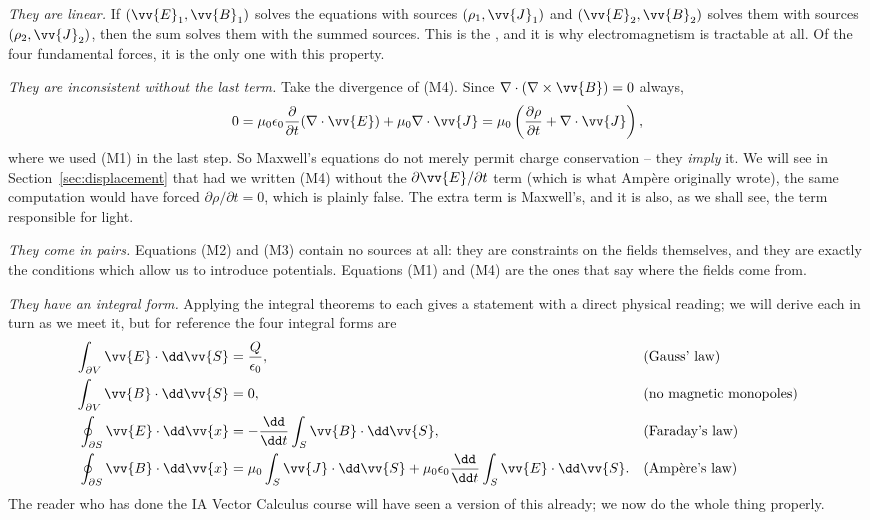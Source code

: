 \emph{They are linear.} If $(\vv{E}_1, \vv{B}_1)$ solves the equations with sources $(\rho_1, \vv{J}_1)$ and $(\vv{E}_2, \vv{B}_2)$ solves them with sources $(\rho_2, \vv{J}_2)$, then the sum solves them with the summed sources. This is the , and it is why electromagnetism is tractable at all. Of the four fundamental forces, it is the only one with this property.

\emph{They are inconsistent without the last term.} Take the divergence of (M4). Since $\nabla \cdot (\nabla \times \vv{B}) = 0$ always,
$$
0 = \mu_0 \epsilon_0 \frac{\partial}{\partial t}(\nabla \cdot \vv{E}) + \mu_0 \nabla \cdot \vv{J} = \mu_0\left(\frac{\partial \rho}{\partial t} + \nabla \cdot \vv{J}\right),
$$
where we used (M1) in the last step. So Maxwell's equations do not merely permit charge conservation -- they \emph{imply} it. We will see in Section~\ref{sec:displacement} that had we written (M4) without the $\partial \vv{E}/\partial t$ term (which is what Amp\`ere originally wrote), the same computation would have forced $\partial \rho/\partial t = 0$, which is plainly false. The extra term is Maxwell's, and it is also, as we shall see, the term responsible for light.

\emph{They come in pairs.} Equations (M2) and (M3) contain no sources at all: they are constraints on the fields themselves, and they are exactly the conditions which allow us to introduce potentials. Equations (M1) and (M4) are the ones that say where the fields come from.

\emph{They have an integral form.} Applying the integral theorems to each gives a statement with a direct physical reading; we will derive each in turn as we meet it, but for reference the four integral forms are
\begin{align*}
	\int_{\partial V} \vv{E}\cdot \dd \vv{S} &= \frac{Q}{\epsilon_0}, & &\text{(Gauss' law)}\\
	\int_{\partial V} \vv{B}\cdot \dd \vv{S} &= 0, & &\text{(no magnetic monopoles)}\\
	\oint_{\partial S} \vv{E} \cdot \dd \vv{x} &= -\frac{\dd}{\dd t}\int_S \vv{B}\cdot \dd \vv{S}, & &\text{(Faraday's law)}\\
	\oint_{\partial S} \vv{B} \cdot \dd \vv{x} &= \mu_0 \int_S \vv{J}\cdot \dd \vv{S} + \mu_0\epsilon_0 \frac{\dd}{\dd t}\int_S \vv{E}\cdot \dd \vv{S}. & &\text{(Amp\`ere's law)}
\end{align*}
The reader who has done the IA Vector Calculus course will have seen a version of this already; we now do the whole thing properly.

